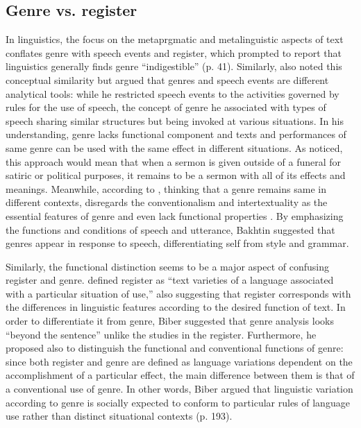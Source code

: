 \documentclass[12pt]{article}
\begin{document}
\subsection{Genre vs. register}
In linguistics, the focus on the metaprgmatic and metalinguistic aspects of text conflates genre with speech events and register, which prompted \textcite{swales1990} to report that linguistics generally finds genre ``indigestible'' (p. 41). Similarly, \textcite{hymes1974} also noted this conceptual similarity but argued that genres and speech events are different analytical tools: while he restricted speech events to the activities governed by rules for the use of speech, the concept of genre he associated with types of speech sharing similar structures but being invoked at various situations. In his understanding, genre lacks functional component and texts and performances of same genre can be used with the same effect in different situations. As \textcite{swales1990} noticed, this approach would mean that when a sermon is given outside of a funeral for satiric or political purposes, it remains to be a sermon with all of its effects and meanings. Meanwhile, according to \textcite{bakhtin1986}, thinking that a genre remains same in different contexts, disregards the conventionalism and intertextuality as the essential features of genre and even lack functional properties . By emphasizing the functions and conditions of speech and utterance, Bakhtin suggested that genres appear in response to speech, differentiating self from style and grammar.  

Similarly, the functional distinction seems to be a major aspect of confusing register and genre. \textcite[p. 191]{biber2012} defined register as ``text varieties of a language associated with a particular situation of use,'' also suggesting that register corresponds with the differences in linguistic features according to the desired function of text. In order to differentiate it from genre, Biber suggested that genre analysis looks ``beyond the sentence'' unlike the studies in the register. Furthermore, he proposed also to distinguish the functional and conventional functions of genre: since both register and genre are defined as language variations dependent on the accomplishment of a particular effect, the main difference between them is that of a conventional use of genre. In other words, Biber argued that linguistic variation according to genre is socially expected to conform to particular rules of language use rather than distinct situational contexts (p. 193). 
\end{document}
